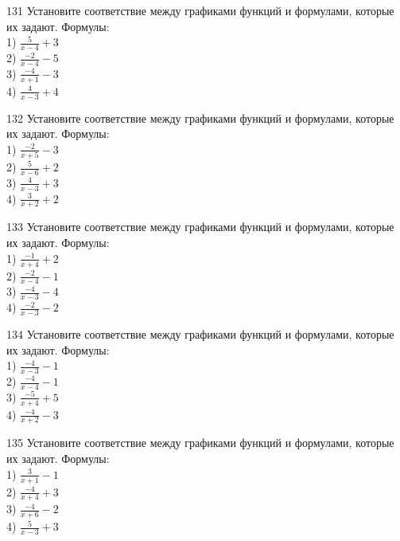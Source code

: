 \documentclass[4apaper]{article}
\begin{document}
\begin{taskBN}{131}
Установите соответствие между графиками функций и формулами, которые их задают. Формулы: \\1) $\frac{5}{x-4}+3$\\2) $\frac{-2}{x-4}-5$\\3) $\frac{-4}{x+1}-3$\\4) $\frac{4}{x-3}+4$
\end{taskBN}

\begin{taskBN}{132}
Установите соответствие между графиками функций и формулами, которые их задают. Формулы: \\1) $\frac{-2}{x+5}-3$\\2) $\frac{5}{x-6}+2$\\3) $\frac{4}{x-3}+3$\\4) $\frac{3}{x+2}+2$
\end{taskBN}

\begin{taskBN}{133}
Установите соответствие между графиками функций и формулами, которые их задают. Формулы: \\1) $\frac{-1}{x+4}+2$\\2) $\frac{-2}{x-4}-1$\\3) $\frac{-4}{x-3}-4$\\4) $\frac{-2}{x-3}-2$
\end{taskBN}

\begin{taskBN}{134}
Установите соответствие между графиками функций и формулами, которые их задают. Формулы: \\1) $\frac{-4}{x-3}-1$\\2) $\frac{-4}{x-4}-1$\\3) $\frac{-5}{x+4}+5$\\4) $\frac{-4}{x+2}-3$
\end{taskBN}

\begin{taskBN}{135}
Установите соответствие между графиками функций и формулами, которые их задают. Формулы: \\1) $\frac{3}{x+1}-1$\\2) $\frac{-4}{x+4}+3$\\3) $\frac{-4}{x+6}-2$\\4) $\frac{5}{x-3}+3$
\end{taskBN}
\end{document}
